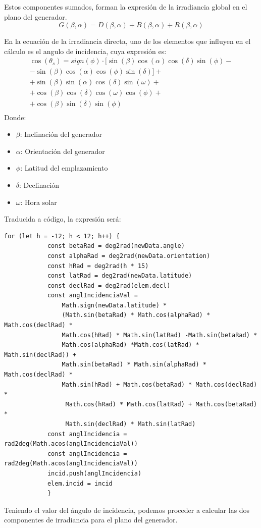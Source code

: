 Estos componentes sumados, forman la expresión de la irradiancia global en el plano del generador.
\begin{equation}
G(\beta,\alpha)=D(\beta,\alpha)+B(\beta,\alpha)+R(\beta,\alpha)
\end{equation}

En la ecuación de la irradiancia directa, uno de los elementos que influyen en el cálculo es el angulo de incidencia, cuya expresión es:
\begin{equation} \label{eqn:ang_incid}
\begin{split}
\cos(\theta_s)=sign(\phi)\cdot [ \sin(\beta)\cos(\alpha)\cos(\delta)\sin(\phi)- \\
-\sin(\beta)\cos(\alpha)\cos(\phi)\sin(\delta)]+ \\
+\sin(\beta)\sin(\alpha)\cos(\delta)\sin(\omega)+ \\
+\cos(\beta)\cos(\delta)\cos(\omega)\cos(\phi)+ \\
+\cos(\beta)\sin(\delta)\sin(\phi) \\
\end{split}
\end{equation}
Donde:
\begin{itemize}
\item \textbf{$\beta$}: Inclinación del generador
\item \textbf{$\alpha$}: Orientación del generador
\item \textbf{$\phi$}: Latitud del emplazamiento
\item \textbf{$\delta$}: Declinación
\item \textbf{$\omega$}: Hora solar
\end{itemize}
\newpage
Traducida a código, la expresión será:
\begin{lstlisting}[style=ES6, caption={Cálculo del ángulo de incidencia}]
		for (let h = -12; h < 12; h++) {
			const betaRad = deg2rad(newData.angle)
			const alphaRad = deg2rad(newData.orientation)
			const hRad = deg2rad(h * 15)
			const latRad = deg2rad(newData.latitude)
			const declRad = deg2rad(elem.decl)
			const anglIncidenciaVal =
				Math.sign(newData.latitude) *
				(Math.sin(betaRad) * Math.cos(alphaRad) * Math.cos(declRad) * 
				Math.cos(hRad) * Math.sin(latRad) -Math.sin(betaRad) * 
				Math.cos(alphaRad) *Math.cos(latRad) * Math.sin(declRad)) +
				Math.sin(betaRad) * Math.sin(alphaRad) * Math.cos(declRad) *
				Math.sin(hRad) + Math.cos(betaRad) * Math.cos(declRad) *
				 Math.cos(hRad) * Math.cos(latRad) + Math.cos(betaRad) * 
				 Math.sin(declRad) * Math.sin(latRad)
			const anglIncidencia = rad2deg(Math.acos(anglIncidenciaVal))
			const anglIncidencia = rad2deg(Math.acos(anglIncidenciaVal))
			incid.push(anglIncidencia)
			elem.incid = incid
			}
\end{lstlisting}
\newpage
Teniendo el valor del ángulo de incidencia, podemos proceder a calcular las dos componentes de irradiancia para el plano del generador.

